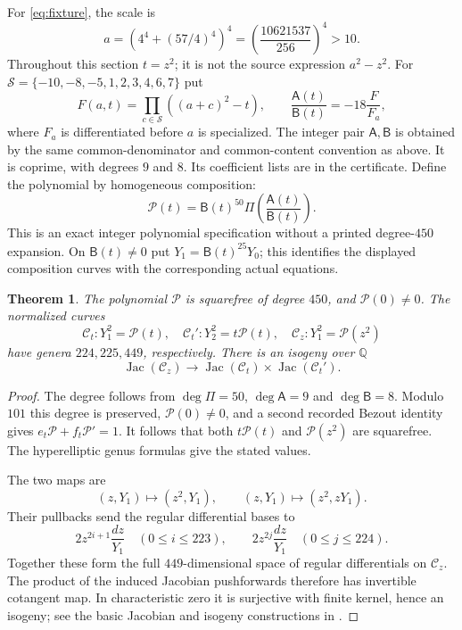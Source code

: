 \documentclass[11pt,a4paper]{article}
\newtheorem{theorem}{Theorem}[section]
\newcommand{\Q}{\mathbb Q}
\DeclareMathOperator{\Jac}{Jac}
\begin{document}
For \eqref{eq:fixture}, the scale is
\[
 a=\left(4^4+(57/4)^4\right)^4
          =\left(\frac{10621537}{256}\right)^4>10.
\]
Throughout this section $t=z^2$; it is not the source expression
$a^2-z^2$. For
$\mathcal S=\{-10,-8,-5,1,2,3,4,6,7\}$ put
\[
 F(a,t)=\prod_{c\in\mathcal S}((a+c)^2-t),\qquad
              \frac{\mathsf A(t)}{\mathsf B(t)}=-18\frac{F}{F_a},
\]
where $F_a$ is differentiated before $a$ is specialized.
The integer pair $\mathsf A,\mathsf B$ is obtained by the same
common-denominator and common-content convention as above. It is
coprime, with degrees $9$ and $8$. Its coefficient lists are in the
certificate. Define the polynomial by homogeneous composition:
\begin{equation}\label{eq:composition}
 \mathcal P(t)=\mathsf B(t)^{50}
                 \Pi\!\left(\frac{\mathsf A(t)}{\mathsf B(t)}\right).
\end{equation}
This is an exact integer polynomial specification without a printed
degree-$450$ expansion. On $\mathsf B(t)\ne0$ put
$Y_1=\mathsf B(t)^{25}Y_0$; this identifies the displayed
composition curves with the corresponding actual equations.

\begin{theorem}\label{thm:genera}
The polynomial $\mathcal P$ is squarefree of degree $450$, and
$\mathcal P(0)\ne0$. The normalized curves
\[
 \mathcal C_t:Y_1^2=\mathcal P(t),\quad
 \mathcal C_t':Y_2^2=t\mathcal P(t),\quad
 \mathcal C_z:Y_1^2=\mathcal P(z^2)
\]
have genera $224,225,449$, respectively. There is an isogeny over
$\Q$
\[
              \Jac(\mathcal C_z)\longrightarrow
              \Jac(\mathcal C_t)\times\Jac(\mathcal C_t').
\]
\end{theorem}
\begin{proof}
The degree follows from $\deg\Pi=50$, $\deg\mathsf A=9$ and
$\deg\mathsf B=8$. Modulo $101$ this degree is preserved,
$\mathcal P(0)\ne0$, and a second recorded Bezout identity gives
$e_t\mathcal P+f_t\mathcal P'=1$. It follows that both
$t\mathcal P(t)$ and $\mathcal P(z^2)$ are squarefree. The
hyperelliptic genus formulas give the stated values.

The two maps are
\[
 (z,Y_1)\longmapsto(z^2,Y_1),\qquad
 (z,Y_1)\longmapsto(z^2,zY_1).
\]
Their pullbacks send the regular differential bases to
\[
 2z^{2i+1}\frac{dz}{Y_1}\quad(0\le i\le223),\qquad
 2z^{2j}\frac{dz}{Y_1}\quad(0\le j\le224).
\]
Together these form the full $449$-dimensional space of regular
differentials on $\mathcal C_z$. The product of the induced
Jacobian pushforwards therefore has invertible cotangent map.
In characteristic zero it is surjective with finite kernel, hence
an isogeny; see the basic Jacobian and isogeny constructions in
\cite{Milne}.
\end{proof}
\end{document}
